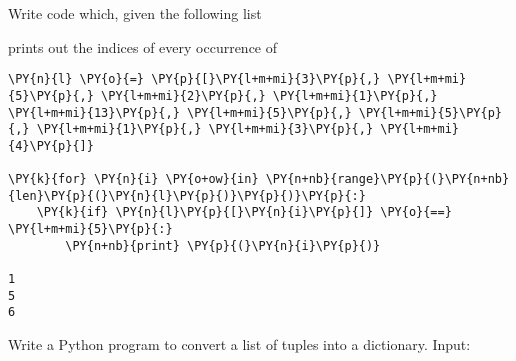 \begin{Exercise}
Write code which, given the following list

\begin{Shaded}
\begin{Highlighting}[]
\OperatorTok{=}\NormalTok{ [}\NormalTok{, }\NormalTok{, }\NormalTok{, }\NormalTok{, }\NormalTok{, }\NormalTok{, }\NormalTok{, }\NormalTok{, }\NormalTok{, }\NormalTok{]}
\end{Highlighting}
\end{Shaded}
prints out the indices of every occurrence of
\begin{Shaded}
\begin{Highlighting}[]
\OperatorTok{=} 
\end{Highlighting}
\end{Shaded}
\end{Exercise}

\begin{Answer}
\begin{tcolorbox}[size=fbox, boxrule=1pt, colback=cellbackground, colframe=cellborder]
\begin{Verbatim}[commandchars=\\\{\}]
\PY{n}{l} \PY{o}{=} \PY{p}{[}\PY{l+m+mi}{3}\PY{p}{,} \PY{l+m+mi}{5}\PY{p}{,} \PY{l+m+mi}{2}\PY{p}{,} \PY{l+m+mi}{1}\PY{p}{,} \PY{l+m+mi}{13}\PY{p}{,} \PY{l+m+mi}{5}\PY{p}{,} \PY{l+m+mi}{5}\PY{p}{,} \PY{l+m+mi}{1}\PY{p}{,} \PY{l+m+mi}{3}\PY{p}{,} \PY{l+m+mi}{4}\PY{p}{]}

\PY{k}{for} \PY{n}{i} \PY{o+ow}{in} \PY{n+nb}{range}\PY{p}{(}\PY{n+nb}{len}\PY{p}{(}\PY{n}{l}\PY{p}{)}\PY{p}{)}\PY{p}{:}
    \PY{k}{if} \PY{n}{l}\PY{p}{[}\PY{n}{i}\PY{p}{]} \PY{o}{==} \PY{l+m+mi}{5}\PY{p}{:}
        \PY{n+nb}{print} \PY{p}{(}\PY{n}{i}\PY{p}{)}

1
5
6
\end{Verbatim}
\end{tcolorbox}
\end{Answer}

\begin{Exercise}
Write a Python program to convert a list of tuples into a dictionary.
Input:
\begin{Shaded}
\begin{Highlighting}[]
\OperatorTok{=}\NormalTok{ [(}\NormalTok{, }\NormalTok{), (}\NormalTok{, }\NormalTok{), (}\NormalTok{, }\NormalTok{), (}\NormalTok{, }\NormalTok{), (}\NormalTok{, }\NormalTok{), (}\NormalTok{, }\NormalTok{)]}
\end{Highlighting}
\end{Shaded}
\end{Exercise}

